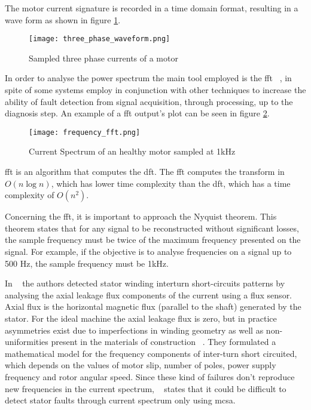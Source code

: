 The motor current signature is recorded in a time domain format, resulting in a wave form as shown in figure \ref{fig:three_phase_sampled}.

\begin{figure}[htpb]
\centering
\texttt{[image: three\_phase\_waveform.png]}
\caption{Sampled three phase currents of a motor}
\label{fig:three_phase_sampled}
\end{figure}

In order to analyse the power spectrum the main tool employed is the \acrfull{fft} ~\cite{Bonaldi2012}, in spite of some systems employ in conjunction with other techniques to increase the ability of fault detection from signal acquisition, through processing, up to the diagnosis step. An example of a \acrshort{fft} output's plot can be seen in figure \ref{fig:frequency_fft}.


\begin{figure}[htpb]
\centering
\texttt{[image: frequency\_fft.png]}
\caption{Current Spectrum of an healthy motor sampled at 1kHz}
\label{fig:frequency_fft}
\end{figure}


\acrshort{fft} is an algorithm that computes the \acrfull{dft}. The \acrshort{fft} computes the transform in $O(n\log{}n)$, which has lower time complexity than the \acrfull{dft}, which has a time complexity of $O(n^2)$.

Concerning the  \acrshort{fft}, it is important to approach the Nyquist theorem. This theorem states that for any signal to be reconstructed without significant losses, the sample frequency must be twice of the maximum frequency presented on the signal. For example, if the objective is to analyse frequencies on a signal up to 500 Hz, the sample frequency must be 1kHz.

In ~\cite{Penman1994} the authors detected stator winding interturn short-circuits patterns by analysing the axial leakage flux components of the current using a flux sensor. 
Axial flux is the horizontal magnetic flux (parallel to the shaft) generated by the stator. For the ideal machine the axial leakage flux is zero, but in practice asymmetries exist due to imperfections in winding geometry as well as non-uniformities present in the materials of construction ~\cite{Penman1994}. They formulated a mathematical model for the frequency components of inter-turn short circuited, which depends on the values of motor slip, number of poles, power supply frequency and rotor angular speed. Since these kind of failures don't reproduce new frequencies in the current spectrum,  ~\cite{Penman1994} states that it could be difficult to detect stator faults through current spectrum only using \acrshort{mcsa}. 

